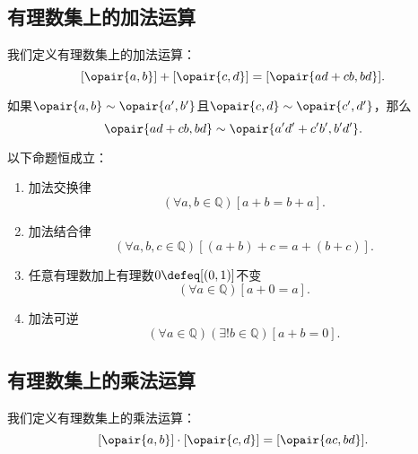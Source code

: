 \subsection{有理数集上的加法运算}
我们定义有理数集上的加法运算：
\begin{equation}\label{equation:集合论.有理数集上的加法运算}
	[\opair{a,b}]+[\opair{c,d}]=[\opair{ad+cb,bd}].
\end{equation}

\begin{lemma}\label{theorem:集合论.有理数集上的加法运算是良定的}
如果\(\opair{a,b}\sim\opair{a',b'}\)且\(\opair{c,d}\sim\opair{c',d'}\)，那么\begin{equation*}
	\opair{ad+cb,bd}\sim\opair{a'd'+c'b',b'd'}.
\end{equation*}
\end{lemma}

\begin{theorem}\label{theorem:集合论.有理数加法的运算法则}
以下命题恒成立：
\begin{enumerate}
	\item 加法交换律
	\begin{equation}\label{equation:集合论.有理数加法交换律}
		(\forall a,b\in\mathbb{Q})[a+b=b+a].
	\end{equation}
	\item 加法结合律
	\begin{equation}\label{equation:集合论.有理数加法结合律}
		(\forall a,b,c\in\mathbb{Q})[(a+b)+c=a+(b+c)].
	\end{equation}
	\item 任意有理数加上有理数\(0\defeq[(0,1)]\)不变
	\begin{equation}\label{equation:集合论.任意有理数加上零不变}
		(\forall a\in\mathbb{Q})[a+0=a].
	\end{equation}
	\item 加法可逆
	\begin{equation}\label{equation:集合论.有理数加法可逆}
		(\forall a\in\mathbb{Q})(\exists!b\in\mathbb{Q})[a+b=0].
	\end{equation}
\end{enumerate}
\end{theorem}

\subsection{有理数集上的乘法运算}
我们定义有理数集上的乘法运算：
\begin{equation}\label{equation:集合论.有理数集上的乘法运算}
	[\opair{a,b}]\cdot[\opair{c,d}]=[\opair{ac,bd}].
\end{equation}

